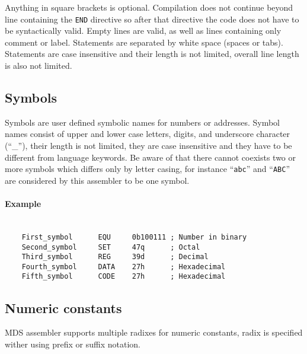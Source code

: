         Anything in square brackets is optional. Compilation does not continue beyond line containing the \texttt{END} directive so after that directive the code does not have to be syntactically valid. Empty lines are valid, as well as lines containing only comment or label. Statements are separated by white space (spaces or tabs). Statements are case insensitive and their length is not limited, overall line length is also not limited.

    \subsection{Symbols}
        Symbols are user defined symbolic names for numbers or addresses. Symbol names consist of upper and lower case letters, digits, and underscore character (``\_''), their length is not limited, they are case insensitive and they have to be different from language keywords. Be aware of that there cannot coexists two or more symbols which differs only by letter casing, for instance ``\texttt{abc}'' and ``\texttt{ABC}'' are considered by this assembler to be one symbol.

        \paragraph{Example}
        ~\\
        \verb'    First_symbol      EQU     0b100111 ; Number in binary'\\
        \verb'    Second_symbol     SET     47q      ; Octal'\\
        \verb'    Third_symbol      REG     39d      ; Decimal'\\
        \verb'    Fourth_symbol     DATA    27h      ; Hexadecimal'\\
        \verb'    Fifth_symbol      CODE    27h      ; Hexadecimal'

    \subsection{Numeric constants}
        MDS assembler supports multiple radixes for numeric constants, radix is specified wither using prefix or suffix notation.

